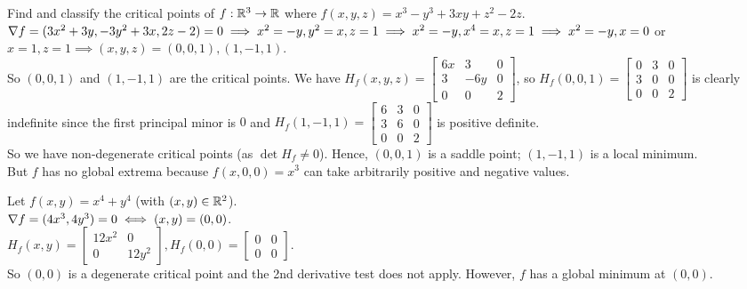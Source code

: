 \begin{example}
    Find and classify the critical points of $f: \mathbb{R}^3 \to \mathbb{R}$ where $f(x,y,z) = x^3 - y^3 + 3xy + z^2 - 2z$. \\
    $\nabla f = (3x^2 + 3y, -3y^2 + 3x, 2z - 2) = 0 \implies x^2 = -y, y^2 = x, z = 1 \implies x^2 = -y, x^4 = x, z = 1 \implies x^2 = -y, x=0$ or $x=1, z=1 \implies (x,y,z) = (0,0,1), (1,-1,1)$. \\
    So $(0,0,1)$ and $(1,-1,1)$ are the critical points.
    We have $H_f(x,y,z) = \begin{bmatrix}
        6x & 3 & 0 \\ 3 & -6y & 0 \\ 0 & 0 & 2
    \end{bmatrix}$, so $H_f(0,0,1) = \begin{bmatrix}
        0 & 3 & 0 \\ 3 & 0 & 0 \\ 0 & 0 & 2
    \end{bmatrix}$ is clearly indefinite since the first principal minor is $0$ and $H_f(1,-1,1) = \begin{bmatrix}
        6 & 3 & 0 \\ 3 & 6 & 0 \\ 0 & 0 & 2
    \end{bmatrix}$ is positive definite. \\
    So we have non-degenerate critical points (as $\det H_f \neq 0$). Hence, $(0,0,1)$ is a saddle point; $(1,-1,1)$ is a local minimum. \\
    But $f$ has no global extrema because $f(x,0,0) = x^3$ can take arbitrarily positive and negative values.
\end{example}

\begin{example}
    Let $f(x,y) = x^4 + y^4$ (with $(x,y) \in \mathbb{R}^2$). \\
    $\nabla f = (4x^3, 4y^3) = 0 \iff (x,y) = (0,0)$. \\
    $H_f(x,y) = \begin{bmatrix}
        12x^2 & 0 \\ 0 & 12y^2
    \end{bmatrix}, H_f(0,0) = \begin{bmatrix}
        0 & 0 \\ 0 & 0
    \end{bmatrix}$. \\
    So $(0,0)$ is a degenerate critical point and the 2nd derivative test does not apply. However, $f$ has a global minimum at $(0,0)$.
\end{example}

